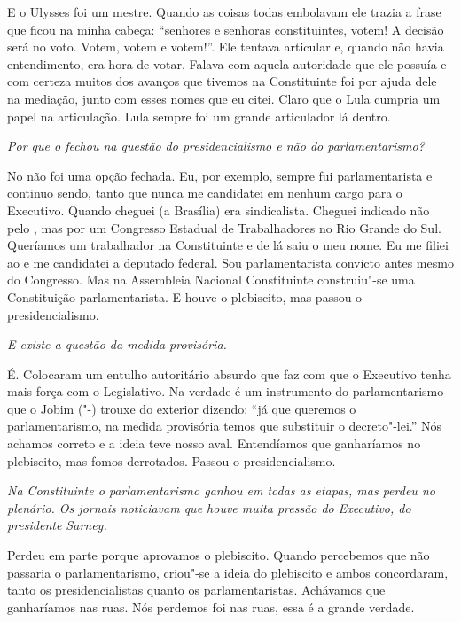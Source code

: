 E o Ulysses foi um mestre. Quando as coisas todas embolavam ele trazia a
frase que ficou na minha cabeça: ``senhores e senhoras constituintes,
votem! A decisão será no voto. Votem, votem e votem!''. Ele tentava
articular e, quando não havia entendimento, era hora de votar. Falava
com aquela autoridade que ele possuía e com certeza muitos dos avanços
que tivemos na Constituinte foi por ajuda dele na mediação, junto com
esses nomes que eu citei. Claro que o Lula cumpria um papel na
articulação. Lula sempre foi um grande articulador lá dentro.

\medskip

\noindent\emph{Por que o  fechou na questão do presidencialismo e não do
parlamentarismo?}

No  não foi uma opção fechada. Eu, por exemplo, sempre
fui parlamentarista e continuo sendo, tanto que nunca me candidatei em
nenhum cargo para o Executivo. Quando cheguei (a Brasília) era
sindicalista. Cheguei indicado não pelo , mas por um Congresso
Estadual de Trabalhadores no Rio Grande do Sul. Queríamos um trabalhador
na Constituinte e de lá saiu o meu nome. Eu me filiei ao  e me
candidatei a deputado federal. Sou parlamentarista convicto antes mesmo
do Congresso. Mas na Assembleia Nacional Constituinte construiu"-se uma
Constituição parlamentarista. E houve o plebiscito, mas passou o
presidencialismo.

\medskip

\noindent\emph{E existe a questão da medida provisória.}

É. Colocaram um entulho autoritário absurdo que faz com
que o Executivo tenha mais força com o Legislativo. Na verdade é um
instrumento do parlamentarismo que o Jobim ("-) trouxe do exterior
dizendo: ``já que queremos o parlamentarismo, na medida provisória temos
que substituir o decreto"-lei.'' Nós achamos correto e a ideia teve nosso
aval. Entendíamos que ganharíamos no plebiscito, mas fomos derrotados.
Passou o presidencialismo.

\medskip

\noindent\emph{Na Constituinte o parlamentarismo ganhou em todas as etapas, mas
perdeu no plenário. Os jornais noticiavam que houve muita pressão do
Executivo, do presidente Sarney.}

Perdeu em parte porque aprovamos o plebiscito. Quando
percebemos que não passaria o parlamentarismo, criou"-se a ideia do
plebiscito e ambos concordaram, tanto os presidencialistas quanto os
parlamentaristas. Achávamos que ganharíamos nas ruas. Nós perdemos foi
nas ruas, essa é a grande verdade.

